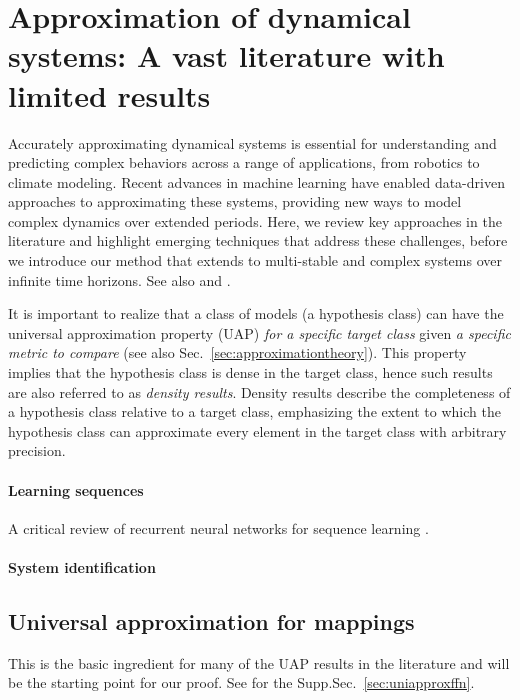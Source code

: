 \documentclass{article}
\theoremstyle{definition}
\theoremstyle{remark}
\newcounter{ct}
\begin{document}
\section{Approximation of dynamical systems: A vast literature with limited results}
Accurately approximating dynamical systems is essential for understanding and predicting complex behaviors across a range of applications, from robotics to climate modeling.
Recent advances in machine learning have enabled data-driven approaches to approximating these systems, providing new ways to model complex dynamics over extended periods.
Here, we review key approaches in the literature and highlight emerging techniques that address these challenges, before we introduce our method that extends to multi-stable and complex systems over infinite time horizons.
See also \citep{li2022approximation} and \citep{jiang2023brief}.

It is important to realize that a class of models (a hypothesis class) can have the universal approximation property (UAP) \emph{for a specific target class} given \emph{a specific metric to compare} (see also Sec.~\ref{sec:approximationtheory}).
This property implies that the hypothesis class is dense in the target class, hence such results are also referred to as \emph{density results}.
Density results describe the completeness of a hypothesis class relative to a target class, emphasizing the extent to which the hypothesis class can approximate every element in the target class with arbitrary precision.

\paragraph{Learning sequences}
 A critical review of recurrent neural networks for sequence learning \citep{williams1989learning, pearlmutter1989learning, lipton2015rnn}.
 
 \paragraph{System identification}
 \citep{werbos1989neural, kuschewski1993application, wang2006fully}
 

\subsection{Universal approximation for mappings}\label{sec:uapmappings}
This is the basic ingredient for many of the UAP results in the literature and will be the starting point for our proof.
See for the  Supp.Sec.~\ref{sec:uniapproxffn}.
\end{document}
